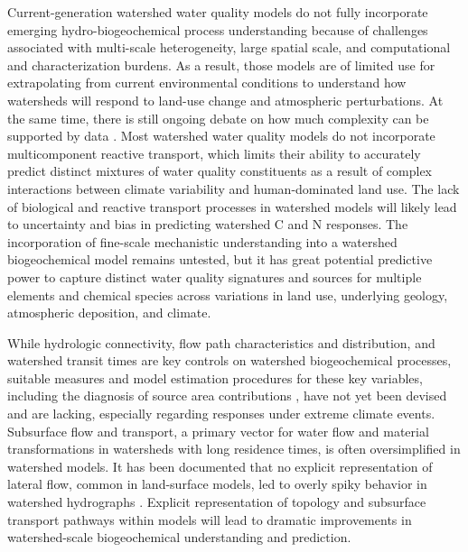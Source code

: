 \documentclass[preprint,review, 12pt]{elsarticle}
\begin{document}
Current-generation watershed water quality models do not fully incorporate emerging hydro-biogeochemical process understanding because of challenges associated with multi-scale heterogeneity, large spatial scale, and computational and characterization burdens. As a result, those models are of limited use for extrapolating from current environmental conditions to understand how watersheds will respond to land-use change and atmospheric perturbations. At the same time, there is still ongoing debate on how much complexity can be supported by data \citep{Jackson-Blakea}. Most watershed water quality models \citep{Kaushal2018f, Vidon2018} do not incorporate multicomponent reactive transport, which limits their ability to accurately predict distinct mixtures of water quality constituents \citep{Kaushal2018f} as a result of complex interactions between climate variability and human-dominated land use. The lack of biological and reactive transport processes in watershed models will likely lead to uncertainty and bias in predicting watershed C and N responses. The incorporation of fine-scale mechanistic understanding into a watershed biogeochemical model remains untested, but it has great potential predictive power to capture distinct water quality signatures and sources for multiple elements and chemical species across variations in land use, underlying geology, atmospheric deposition, and climate. 
    
While hydrologic connectivity, flow path characteristics and distribution, and watershed transit times are key controls on watershed biogeochemical processes, suitable measures and model estimation procedures for these key variables, including the diagnosis of source area contributions \citep{Hewlett1967}, have not yet been devised and are lacking, especially regarding responses under extreme climate events. Subsurface flow and transport, a primary vector for water flow and material transformations in watersheds with long residence times, is often oversimplified in watershed models. It has been documented that no explicit representation of lateral flow, common in land-surface models, led to overly spiky behavior in watershed hydrographs \citep{Clark2015d}. Explicit representation of topology and subsurface transport pathways within models will lead to dramatic improvements in watershed-scale biogeochemical understanding and prediction.
    
\end{document}
